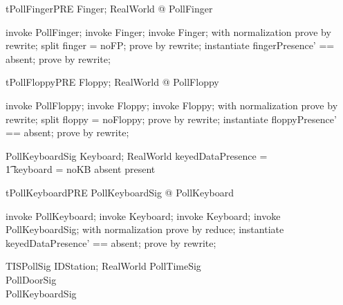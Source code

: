 \begin{theorem}{tPollFingerPRE}
   \forall Finger; RealWorld @ \pre PollFinger
\end{theorem}

\begin{zproof}[tPollFingerPRE]
invoke PollFinger;
invoke \Delta Finger;
invoke Finger;
with normalization prove by rewrite;
split finger = noFP;
prove by rewrite;
instantiate fingerPresence' == absent;
prove by rewrite;
\end{zproof}

\begin{theorem}{tPollFloppyPRE}
   \forall Floppy; RealWorld @ \pre PollFloppy
\end{theorem}

\begin{zproof}[tPollFloppyPRE]
invoke PollFloppy;
invoke \Delta Floppy;
invoke Floppy;
with normalization prove by rewrite;
split floppy = noFloppy;
prove by rewrite;
instantiate floppyPresence' == absent;
prove by rewrite;
\end{zproof}

\begin{schema}{PollKeyboardSig}
   Keyboard; RealWorld
\where
   keyedDataPresence = \\
    \t1 \IF keyboard = noKB \THEN absent \ELSE present
\end{schema}

\begin{theorem}{tPollKeyboardPRE}
    \forall PollKeyboardSig @ \pre PollKeyboard
\end{theorem}

\begin{zproof}[tPollKeyboardPRE]
invoke PollKeyboard;
invoke \Delta Keyboard;
invoke Keyboard;
invoke PollKeyboardSig;
with normalization prove by reduce;
instantiate keyedDataPresence' == absent;
prove by rewrite;
\end{zproof}

\begin{schema}{TISPollSig}
   IDStation; RealWorld
\where
   PollTimeSig \\
   PollDoorSig \\
   PollKeyboardSig
\end{schema}

